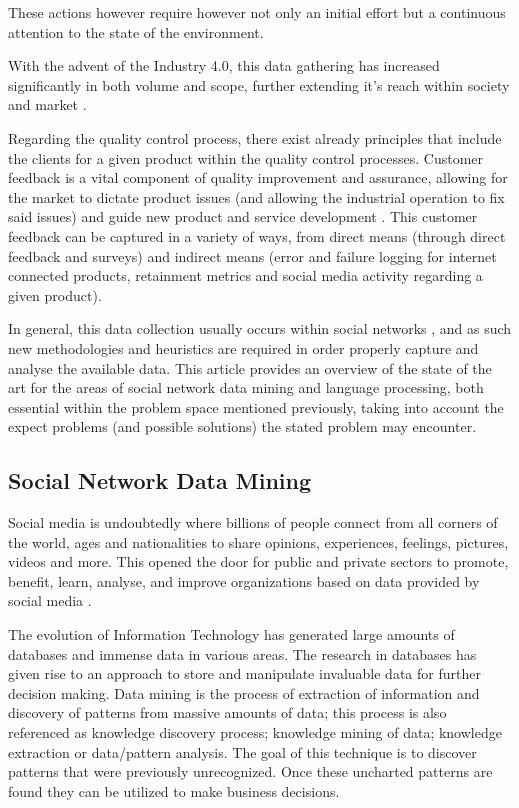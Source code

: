 \documentclass[runningheads]{llncs}
\begin{document}
These actions however require however not only an initial effort but a continuous attention to the state of the environment.

With the advent of the Industry 4.0, this data gathering has increased significantly in both volume and scope, further extending it's reach within society and market \cite{Hood_Brady_2016}.

Regarding the quality control process, there exist already principles that include the clients for a given product within the quality control processes. Customer feedback is a vital component of quality improvement and assurance, allowing for the market to dictate product issues (and allowing the industrial operation to fix said issues) and guide new product and service development \cite{Fundin2003}. This customer feedback can be captured in a variety of ways, from direct means (through direct feedback and surveys) and indirect means (error and failure logging for internet connected products, retainment metrics and social media activity regarding a given product).

In general, this data collection usually occurs within social networks \cite{a_james}, and as such new methodologies and heuristics are required in order properly capture and analyse the available data. This article provides an overview of the state of the art for the areas of social network data mining and language processing, both essential within the problem space mentioned previously, taking into account the expect problems (and possible solutions) the stated problem may encounter.

\subsection{Social Network Data Mining}

Social media is undoubtedly where billions of people connect from all corners of the world, ages and nationalities to share opinions, experiences, feelings, pictures, videos and more. This opened the door for public and private sectors to promote, benefit, learn, analyse, and improve organizations based on data provided by social media \cite{McCourt_2018}.

The evolution of Information Technology has generated large amounts of databases and immense data in various areas. The research in databases has given rise to an approach to store and manipulate invaluable data for further decision making. Data mining is the process of extraction of information and discovery of patterns from massive amounts of data; this process is also referenced as knowledge discovery process; knowledge mining of data; knowledge extraction or data/pattern analysis. The goal of this technique is to discover patterns that were previously unrecognized. Once these uncharted patterns are found they can be utilized to make business decisions.
\end{document}
